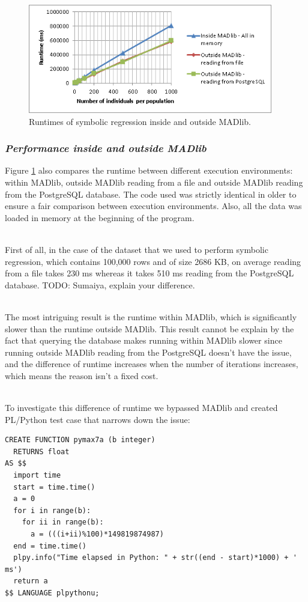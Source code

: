 \begin{figure}[ht]
\centering
\includegraphics[height=180px]{gp-inside-vs-outside.png}
\caption{Runtimes of symbolic regression inside and outside MADlib.}
\label{fig:gp-inside-vs-outside}
\end{figure}

\subsubsection*{\itshape Performance inside and outside MADlib}
Figure \ref{fig:gp-inside-vs-outside} also compares the runtime between different execution environments: within MADlib, outside MADlib reading from a file and outside MADlib reading from the PostgreSQL database. The code used was strictly identical in older to ensure a fair comparison between execution environments. Also, all the data was loaded in memory at the beginning of the program.

~~\\
First of all, in the case of the dataset that we used to perform symbolic regression, which contains 100,000 rows and of size 2686 KB, on average reading from a file takes 230 ms whereas it takes 510 ms reading from the PostgreSQL database. TODO: Sumaiya, explain your difference.

~~\\
The most intriguing result is the runtime within MADlib, which is significantly slower than the runtime outside MADlib. This result cannot be explain by the fact that querying the database makes running within MADlib slower since running outside MADlib reading from the PostgreSQL doesn't have the issue, and the difference of runtime increases when the number of iterations increases, which means the reason isn't a fixed cost.

~~\\
To investigate this difference of runtime we bypassed MADlib and created PL/Python test case that narrows down the issue:

\begin{verbatim}
CREATE FUNCTION pymax7a (b integer)
  RETURNS float
AS $$
  import time
  start = time.time()
  a = 0
  for i in range(b):
    for ii in range(b):
      a = (((i+ii)%100)*149819874987)
  end = time.time()
  plpy.info("Time elapsed in Python: " + str((end - start)*1000) + ' ms')
  return a
$$ LANGUAGE plpythonu;
\end{verbatim}

